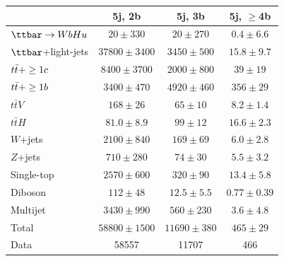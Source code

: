 \begin{table}[htbp]
\begin{center}
\begin{tabular}{l*{3}{c}}
\hline\hline
 & 5j, 2b & 5j, 3b & 5j, $\geq$4b \\
\hline
$\Hu$  &   $ 20 \pm 330 $ &   $ 20 \pm 270 $ &   $ 0.4 \pm 6.6 $ \\ 
\hline
$\ttbar$+light-jets  &   $ 37800 \pm 3400 $ &   $ 3450 \pm 500 $ &   $ 15.8 \pm 9.7 $ \\ 
$t\bar{t}+\geq1c$  &   $ 8400 \pm 3700 $ &   $ 2000 \pm 800 $ &   $ 39 \pm 19 $ \\ 
$t\bar{t}+\geq1b$  &   $ 3400 \pm 470 $ &   $ 4920 \pm 460 $ &   $ 356 \pm 29 $ \\ 
$t\bar{t}V$  &   $ 168 \pm 26 $ &   $ 65 \pm 10 $ &   $ 8.2 \pm 1.4 $ \\ 
$t\bar{t}H$  &   $ 81.0 \pm 8.9 $ &   $ 99 \pm 12 $ &   $ 16.6 \pm 2.3 $ \\ 
$W$+jets  &   $ 2100 \pm 840 $ &   $ 169 \pm 69 $ &   $ 6.0 \pm 2.8 $ \\ 
$Z$+jets  &   $ 710 \pm 280 $ &   $ 74 \pm 30 $ &   $ 5.5 \pm 3.2 $ \\ 
Single-top  &   $ 2570 \pm 600 $ &   $ 320 \pm 90 $ &   $ 13.4 \pm 5.8 $ \\ 
Diboson  &   $ 112 \pm 48 $ &   $ 12.5 \pm 5.5 $ &   $ 0.77 \pm 0.39 $ \\ 
Multijet  &   $ 3430 \pm 990 $ &   $ 560 \pm 230 $ &   $ 3.6 \pm 4.8 $ \\ 
\hline
Total &   $ 58800 \pm 1500 $ &   $ 11690 \pm 380 $ &   $ 465 \pm 29 $ \\ 
\hline
Data & 58557  & 11707  & 466  \\ 
\hline\hline      
\end{tabular}
\vspace{0.2cm}


\end{center}
\end{table}
